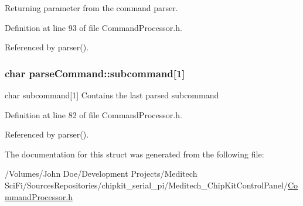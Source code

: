 Returning parameter from the command parser. 



Definition at line 93 of file Command\-Processor.\-h.



Referenced by parser().

\hypertarget{structparse_command_a10312bf6b72a9315a4fb550458bc3ae9}{
\subsubsection[{subcommand}]{\setlength{\rightskip}{0pt plus 5cm}char parse\-Command\-::subcommand\mbox{[}1\mbox{]}}}\label{structparse_command_a10312bf6b72a9315a4fb550458bc3ae9}


char subcommand\mbox{[}1\mbox{]} Contains the last parsed subcommand 



Definition at line 82 of file Command\-Processor.\-h.



Referenced by parser().



The documentation for this struct was generated from the following file\-:\begin{DoxyCompactItemize}
\item 
/\-Volumes/\-John Doe/\-Development Projects/\-Meditech Sci\-Fi/\-Sources\-Repositories/chipkit\-\_\-serial\-\_\-pi/\-Meditech\-\_\-\-Chip\-Kit\-Control\-Panel/\hyperlink{_command_processor_8h}{Command\-Processor.\-h}\end{DoxyCompactItemize}
